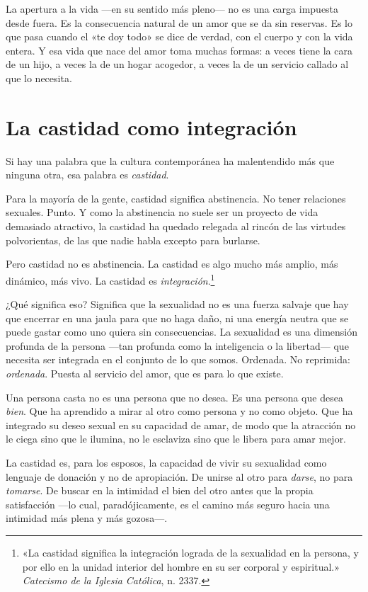 La apertura a la vida ---en su sentido más pleno--- no es una carga impuesta desde fuera. Es la consecuencia natural de un amor que se da sin reservas. Es lo que pasa cuando el «te doy todo» se dice de verdad, con el cuerpo y con la vida entera. Y esa vida que nace del amor toma muchas formas: a veces tiene la cara de un hijo, a veces la de un hogar acogedor, a veces la de un servicio callado al que lo necesita.

\section{La castidad como integración}

Si hay una palabra que la cultura contemporánea ha malentendido más que ninguna otra, esa palabra es \emph{castidad}.

Para la mayoría de la gente, castidad significa abstinencia. No tener relaciones sexuales. Punto. Y como la abstinencia no suele ser un proyecto de vida demasiado atractivo, la castidad ha quedado relegada al rincón de las virtudes polvorientas, de las que nadie habla excepto para burlarse.

Pero castidad no es abstinencia. La castidad es algo mucho más amplio, más dinámico, más vivo. La castidad es \emph{integración}.\footnote{«La castidad significa la integración lograda de la sexualidad en la persona, y por ello en la unidad interior del hombre en su ser corporal y espiritual.» \textit{Catecismo de la Iglesia Católica}, n. 2337.}

¿Qué significa eso? Significa que la sexualidad no es una fuerza salvaje que hay que encerrar en una jaula para que no haga daño, ni una energía neutra que se puede gastar como uno quiera sin consecuencias. La sexualidad es una dimensión profunda de la persona ---tan profunda como la inteligencia o la libertad--- que necesita ser integrada en el conjunto de lo que somos. Ordenada. No reprimida: \emph{ordenada}. Puesta al servicio del amor, que es para lo que existe.

Una persona casta no es una persona que no desea. Es una persona que desea \emph{bien}. Que ha aprendido a mirar al otro como persona y no como objeto. Que ha integrado su deseo sexual en su capacidad de amar, de modo que la atracción no le ciega sino que le ilumina, no le esclaviza sino que le libera para amar mejor.

La castidad es, para los esposos, la capacidad de vivir su sexualidad como lenguaje de donación y no de apropiación. De unirse al otro para \emph{darse}, no para \emph{tomarse}. De buscar en la intimidad el bien del otro antes que la propia satisfacción ---lo cual, paradójicamente, es el camino más seguro hacia una intimidad más plena y más gozosa---.

